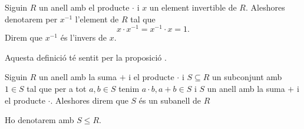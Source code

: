 \documentclass[../../Main.tex]{subfiles}
\begin{document}
	\begin{definition}
		\label{def:l'invers d'un element d'un anell}
		Siguin \(R\) un anell amb el producte \(\cdot\) i \(x\) un element invertible de \(R\). Aleshores denotarem per \(x^{-1}\) l'element de \(R\) tal que
		\[x\cdot x^{-1}=x^{-1}\cdot x=1.\]
		Direm que \(x^{-1}\) és l'invers de \(x\).
		
		Aquesta definició té sentit per la proposició .
	\end{definition}
	\begin{definition}[Subanell]
		\label{def:subanell}
		Siguin \(R\) un anell amb la suma \(+\) i el producte \(\cdot\) i \(S\subseteq R\) un subconjunt amb \(1\in S\) tal que per a tot \(a,b\in S\) tenim \(a\cdot b,a+b\in S\) i \(S\) un anell amb la suma \(+\) i el producte \(\cdot\). Aleshores direm que \(S\) és un subanell de \(R\)
		
		Ho denotarem amb \(S\leq R\).
	\end{definition}
\end{document}
